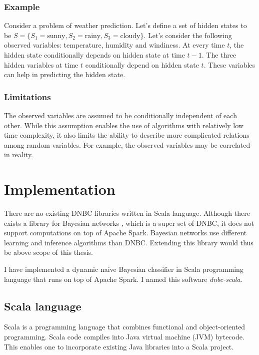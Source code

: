 \documentclass[thesis=B,english]{FITthesis}[2012/06/26]
\begin{document}
\subsection{Example}

Consider a problem of weather prediction. Let's define a set of hidden states to be $S = \{S_1 = \text{sunny}, S_2 = \text{rainy}, S_3 = \text{cloudy} \}$. Let's consider the following observed variables: temperature, humidity and windiness. At every time $t$, the hidden state conditionally depends on hidden state at time $t-1$. The three hidden variables at time $t$ conditionally depend on hidden state $t$. These variables can help in predicting the hidden state.

\subsection{Limitations}

The observed variables are assumed to be conditionally independent of each other. While this assumption enables the use of algorithms with relatively low time complexity, it also limits the ability to describe more complicated relations among random variables. For example, the observed variables may be correlated in reality.

\chapter{Implementation} \label{ch:implementation}

There are no existing DNBC libraries written in Scala language. Although there exists a library for Bayesian networks \cite{bayesian-networks}, which is a super set of DNBC, it does not support computations on top of Apache Spark. Bayesian networks use different learning and inference algorithms than DNBC. Extending this library would thus be above scope of this thesis.

I have implemented a dynamic naive Bayesian classifier in Scala programming language that runs on top of Apache Spark. I named this software \textit{dnbc-scala}.

\section{Scala language}

Scala is a programming language that combines functional and object-oriented programming. Scala code compiles into Java virtual machine (JVM) bytecode. This enables one to incorporate existing Java libraries into a Scala project.
\end{document}
